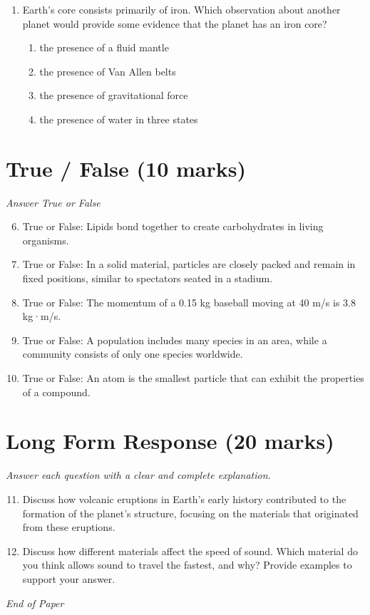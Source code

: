 \documentclass[12pt]{article}
\begin{document}
\begin{enumerate}[label=\arabic*.]
\begin{enumerate}[label=(\alph*)]
    \item The Sun is at the center of the Milky Way Galaxy.
    \item The Sun is a medium-sized star near the edge of the Milky Way Galaxy.
    \item The Sun has the Milky Way and several other galaxies moving in orbits around it.
\end{enumerate}
\item Earth's core consists primarily of iron. Which observation about another planet would provide some evidence that the planet has an iron core?
\begin{enumerate}[label=(\alph*)]
    \item the presence of a fluid mantle
    \item the presence of Van Allen belts
    \item the presence of gravitational force
    \item the presence of water in three states
\end{enumerate}
\end{enumerate}

\section*{True / False (10 marks)}
\textit{Answer True or False}
\begin{enumerate}[label=\arabic*.]
\setcounter{enumi}{5}
\item True or False: Lipids bond together to create carbohydrates in living organisms.
\item True or False: In a solid material, particles are closely packed and remain in fixed positions, similar to spectators seated in a stadium.
\item True or False: The momentum of a 0.15 kg baseball moving at 40 m/s is 3.8 kg·m/s.
\item True or False: A population includes many species in an area, while a community consists of only one species worldwide.
\item True or False: An atom is the smallest particle that can exhibit the properties of a compound.
\end{enumerate}

\section*{Long Form Response (20 marks)}
\textit{Answer each question with a clear and complete explanation.}
\begin{enumerate}[label=\arabic*.]
\setcounter{enumi}{10}
\item Discuss how volcanic eruptions in Earth's early history contributed to the formation of the planet's structure, focusing on the materials that originated from these eruptions.
\item Discuss how different materials affect the speed of sound. Which material do you think allows sound to travel the fastest, and why? Provide examples to support your answer.
\end{enumerate}

\vfill
\noindent\textit{End of Paper}
\end{document}
